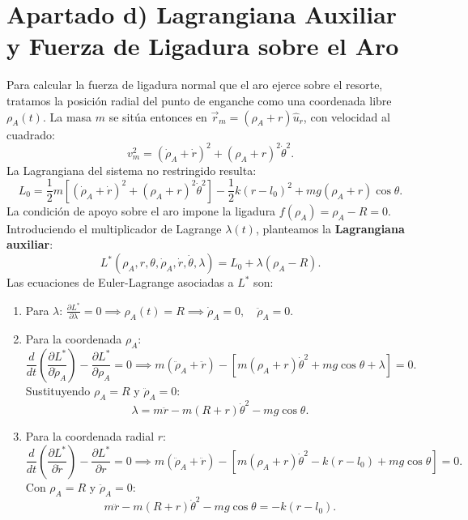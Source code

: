 \documentclass[11pt,a4paper]{article}
\begin{document}
\section*{Apartado d) Lagrangiana Auxiliar y Fuerza de Ligadura sobre el Aro}

Para calcular la fuerza de ligadura normal que el aro ejerce sobre el resorte, tratamos la posición radial del punto de enganche como una coordenada libre $\rho_A(t)$. La masa $m$ se sitúa entonces en $\vec{r}_m = (\rho_A + r)\hat{u}_r$, con velocidad al cuadrado:
\begin{equation}
v_m^2 = (\dot{\rho}_A + \dot{r})^2 + (\rho_A + r)^2\dot{\theta}^2.
\end{equation}
La Lagrangiana del sistema no restringido resulta:
\begin{equation}
L_0 = \frac{1}{2}m\left[ (\dot{\rho}_A + \dot{r})^2 + (\rho_A + r)^2\dot{\theta}^2 \right] - \frac{1}{2}k(r - l_0)^2 + mg(\rho_A + r)\cos\theta.
\end{equation}
La condición de apoyo sobre el aro impone la ligadura $f(\rho_A) = \rho_A - R = 0$. Introduciendo el multiplicador de Lagrange $\lambda(t)$, planteamos la \textbf{Lagrangiana auxiliar}:
\begin{equation}
\boxed{L^*(\rho_A, r, \theta, \dot{\rho}_A, \dot{r}, \dot{\theta}, \lambda) = L_0 + \lambda(\rho_A - R).}
\end{equation}
Las ecuaciones de Euler-Lagrange asociadas a $L^*$ son:
\begin{enumerate}
    \item Para $\lambda$: $\frac{\partial L^*}{\partial \lambda} = 0 \implies \rho_A(t) = R \implies \dot{\rho}_A = 0, \quad \ddot{\rho}_A = 0$.
    \item Para la coordenada $\rho_A$:
    \begin{equation*}
    \frac{d}{dt}\left(\frac{\partial L^*}{\partial \dot{\rho}_A}\right) - \frac{\partial L^*}{\partial \rho_A} = 0 \implies m(\ddot{\rho}_A + \ddot{r}) - \left[ m(\rho_A + r)\dot{\theta}^2 + mg\cos\theta + \lambda \right] = 0.
    \end{equation*}
    Sustituyendo $\rho_A = R$ y $\ddot{\rho}_A = 0$:
    \begin{equation}
    \lambda = m\ddot{r} - m(R + r)\dot{\theta}^2 - mg\cos\theta. \label{eq:lambda_exp}
    \end{equation}
    \item Para la coordenada radial $r$:
    \begin{equation*}
    \frac{d}{dt}\left(\frac{\partial L^*}{\partial \dot{r}}\right) - \frac{\partial L^*}{\partial r} = 0 \implies m(\ddot{\rho}_A + \ddot{r}) - \left[ m(\rho_A + r)\dot{\theta}^2 - k(r - l_0) + mg\cos\theta \right] = 0.
    \end{equation*}
    Con $\rho_A = R$ y $\ddot{\rho}_A = 0$:
    \begin{equation}
    m\ddot{r} - m(R + r)\dot{\theta}^2 - mg\cos\theta = -k(r - l_0). \label{eq:r_aux_exp}
    \end{equation}
\end{enumerate}
\end{document}
